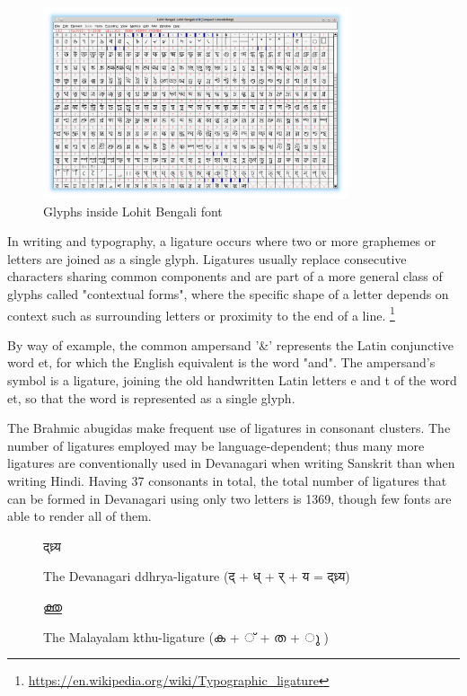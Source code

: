 \begin{figure}[h]
    \centering
    \includegraphics[width=0.8\textwidth]{glyph-fontforge-lohit-bengali.png}
    \caption{Glyphs inside Lohit Bengali font}
\end{figure}


In writing and typography, a ligature occurs where two or more graphemes or letters are joined as a single glyph. Ligatures usually replace consecutive characters sharing common components and are part of a more general class of glyphs called "contextual forms", where the specific shape of a letter depends on context such as surrounding letters or proximity to the end of a line.
\footnote{\url{https://en.wikipedia.org/wiki/Typographic_ligature}}

By way of example, the common ampersand '\&' represents the Latin conjunctive word et, for which the English equivalent is the word "and". The ampersand's symbol is a ligature, joining the old handwritten Latin letters e and t of the word et, so that the word is represented as a single glyph.

The Brahmic abugidas make frequent use of ligatures in consonant clusters. The number of ligatures employed may be language-dependent; thus many more ligatures are conventionally used in Devanagari when writing Sanskrit than when writing Hindi. Having 37 consonants in total, the total number of ligatures that can be formed in Devanagari using only two letters is 1369, though few fonts are able to render all of them.

\begin{figure}[h]
   \centering
   {\hindi\textexample द्ध्र्य }
   \caption{The Devanagari ddhrya-ligature {\hindi (द् + ध् + र् + य = द्ध्र्य) } }
\end{figure}

\begin{figure}[h]
   \centering
   {\malayalam\textexample  ക്തു}
   \caption{The Malayalam kthu-ligature {\malayalam (ക + ് + ത + ു ) } }
\end{figure}


